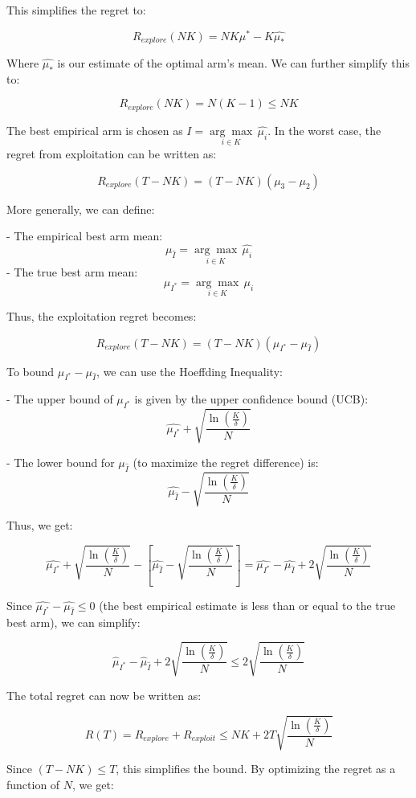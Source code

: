 This simplifies the regret to:

$$
    R_{explore}(NK) = NK\mu^* - K \hat{\mu_*}
$$

Where $\hat{\mu_*}$ is our estimate of the optimal arm's mean. We can further simplify this to:

$$
    R_{explore}(NK) = N(K-1) \leq NK
$$

The best empirical arm is chosen as $I = \underset{i \in K}{\arg\max} \, \hat{\mu_i}$. In the worst case, the regret from exploitation can be written as:

$$
    R_{explore}(T-NK) = (T-NK)(\mu_3 - \mu_2)
$$

More generally, we can define:

- The empirical best arm mean:
$$
    \mu_{\hat{I}} = \underset{i \in K}{\arg\max} \, \hat{\mu_i}
$$
- The true best arm mean:
$$
    \mu_{I^*} = \underset{i \in K}{\arg\max} \, \mu_i
$$

Thus, the exploitation regret becomes:

$$
    R_{explore}(T-NK) = (T-NK)(\mu_{I^*} - \mu_{\hat{I}})
$$

To bound $\mu_{I^*} - \mu_{\hat{I}}$, we can use the Hoeffding Inequality:

- The upper bound of $\mu_{I^*}$ is given by the upper confidence bound (UCB):
$$
    \hat{\mu_{I^*}} + \sqrt{\frac{\ln(\frac{K}{\delta})}{N}}
$$

- The lower bound for $\mu_{\hat{I}}$ (to maximize the regret difference) is:
$$
    \hat{\mu_{\hat{I}}} - \sqrt{\frac{\ln(\frac{K}{\delta})}{N}}
$$

Thus, we get:

$$
    \hat{\mu_{I^*}} + \sqrt{\frac{\ln(\frac{K}{\delta})}{N}} - [\hat{\mu_{\hat{I}}} - \sqrt{\frac{\ln(\frac{K}{\delta})}{N}}] = \hat{\mu_{I^*}} - \hat{\mu_{\hat{I}}} + 2\sqrt{\frac{\ln(\frac{K}{\delta})}{N}}
$$

Since $\hat{\mu_{I^*}} - \hat{\mu_{\hat{I}}} \leq 0$ (the best empirical estimate is less than or equal to the true best arm), we can simplify:

$$
    \hat{\mu}_{I^*} - \hat{\mu}_{\hat{I}} + 2\sqrt{\frac{\ln(\frac{K}{\delta})}{N}} \leq 2\sqrt{\frac{\ln(\frac{K}{\delta})}{N}}
$$

The total regret can now be written as:

$$
    R(T) = R_{explore} + R_{exploit} \leq NK + 2T\sqrt{\frac{\ln(\frac{K}{\delta})}{N}}
$$

Since $(T - NK) \leq T$, this simplifies the bound. By optimizing the regret as a function of $N$, we get:

